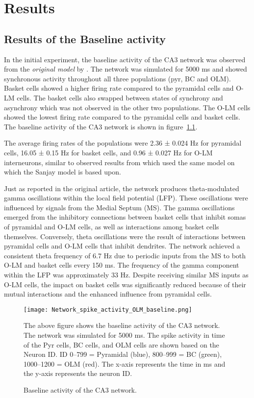 \chapter{Results}

\section{Results of the Baseline activity}
In the initial experiment, the baseline activity of the CA3 network was
observed from the \textit{original model} by
\textcite{sanjayImpairedDendriticInhibition2015}. The network was simulated for
5000 ms and showed synchronous activity throughout all three
populations (pyr, BC and OLM). Basket cells showed a higher firing rate
compared to the pyramidal cells and O-LM cells. The basket cells also swapped
between states of synchrony and asynchrony which was not observed in the other
two populations. The O-LM cells showed the lowest firing rate compared to the
pyramidal cells and basket cells. The baseline activity of the CA3 network is
shown in figure~\ref{fig:baseline_activity}.

The average firing rates of the populations were 2.36 ± 0.024 Hz for pyramidal cells, 
16.05 ± 0.15 Hz for basket cells, and 0.96 ± 0.027 Hz for O-LM interneurons, 
similar to observed results from \textcite{neymotinKetamineDisruptsTheta2011} which used the same model on which the Sanjay model is based upon.

Just as reported in the original article, the network produces theta-modulated gamma oscillations 
within the local field potential (LFP). These oscillations were influenced by signals from the Medial Septum (MS). 
The gamma oscillations emerged from the inhibitory connections between basket cells that inhibit somas of pyramidal and O-LM cells, 
as well as interactions among basket cells themselves. Conversely, theta oscillations were the result of interactions between 
pyramidal cells and O-LM cells that inhibit dendrites. The network achieved a consistent theta frequency of 6.7 Hz due to periodic inputs 
from the MS to both O-LM and basket cells every 150 ms. The frequency of the gamma component within the LFP was approximately 33 Hz. 
Despite receiving similar MS inputs as O-LM cells, the impact on basket cells was significantly reduced because of their mutual interactions 
and the enhanced influence from pyramidal cells.

\begin{figure}[htbp]
    \centering
    \texttt{[image: Network\_spike\_activity\_OLM\_baseline.png]}
    \caption[Baseline activity of the CA3 network]{Baseline activity of the CA3 network.}\label{fig:baseline_activity}
    \begin{minipage}{0.9\textwidth}
        The above figure shows the baseline activity of the CA3 network. The network was simulated for 5000 ms. 
        The spike activity in time of the Pyr cells, BC cells, and OLM cells are shown based on the Neuron ID\@. 
        ID 0--799 = Pyramidal (blue), 800--999 = BC (green), 1000--1200 = OLM (red). 
        The x-axis represents the time in ms and the y-axis represents the neuron ID\@.
    \end{minipage}
\end{figure}
\pagebreak

